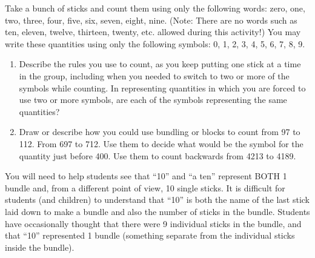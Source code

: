 \documentclass{ximera}
\begin{document}
\begin{problem}
 Take a bunch of sticks and count them using only the following words: zero, one, two, three, four, five, six, seven, eight, nine. (Note:  There are no words such as ten, eleven, twelve, thirteen, twenty, etc. allowed during this activity!)  You may write these quantities using only the following symbols:  0, 1, 2, 3, 4, 5, 6, 7, 8, 9.
\begin{enumerate}
\item Describe the rules you use to count, as you keep putting one stick at a time in the group, including when you needed to switch to two or more of the symbols while counting.  In representing quantities in which you are forced to use two or more symbols, are each of the symbols representing the same quantities?  
\item Draw or describe how you could use bundling or blocks to count from 97 to 112.  From 697 to 712.  Use them to decide what would be the symbol for the quantity just before 400.  Use them to count backwards from 4213 to 4189.
\end{enumerate}

\begin{instructorNotes}
You will need to help students see that ``10'' and ``a ten'' represent BOTH 1 bundle and, from a different point of view, 10 single sticks.  It is difficult for students (and children) to understand that ``10'' is both the name of the last stick laid down to make a bundle and also the number of sticks in the bundle.  Students have occasionally thought that there were 9 individual sticks in the bundle, and that ``10'' represented 1 bundle (something separate from the individual sticks inside the bundle).


\end{instructorNotes}
\end{problem}
\end{document}
